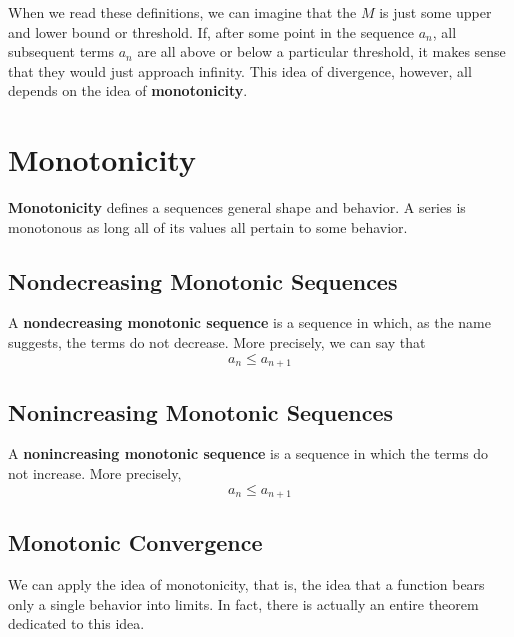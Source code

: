 \documentclass{report}
\begin{document}
\begin{sloppypar}
When we read these definitions, we can imagine that the $ M $ is just some upper and lower bound or threshold. If, after
some point in the sequence $ a_{n} $, all subsequent terms $ a_{n} $ are all above or below a particular threshold, it makes
sense that they would just approach infinity. This idea of divergence, however, all depends on the idea of
\textbf{monotonicity}.

\section{Monotonicity}
\textbf{Monotonicity} defines a sequences general shape and behavior. A series is monotonous as long all of its values
all pertain to some behavior.
\\
\subsection{Nondecreasing Monotonic Sequences}
A \textbf{nondecreasing monotonic sequence} is a sequence in which, as the name suggests, the terms do not decrease.
More precisely, we can say that
\[ a_{n} \leq a_{n+1} \]
\subsection{Nonincreasing Monotonic Sequences}
A \textbf{nonincreasing monotonic sequence} is a sequence in which the terms do not increase. More precisely,
\[ a_{n} \leq a_{n+1} \]

\subsection{Monotonic Convergence}
We can apply the idea of monotonicity, that is, the idea that a function bears only a single behavior into limits. In fact,
there is actually an entire theorem dedicated to this idea.

\begin{center}
\end{center}


\end{sloppypar}
\end{document}

